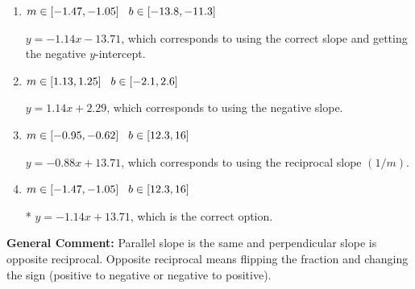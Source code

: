 \documentclass{extbook}[14pt]
\begin{document}
\begin{enumerate}
{\begin{enumerate}[label=\Alph*.]
 $y = -1.14x + 3.00$, which corresponds to correct slope and mis-distributing while simplifying to slope-intercept form.
\item \( m \in [-1.47, -1.05] \hspace*{3mm} b \in [-13.8, -11.3] \)

 $y = -1.14x - 13.71$, which corresponds to using the correct slope and getting the negative $y$-intercept.
\item \( m \in [1.13, 1.25] \hspace*{3mm} b \in [-2.1, 2.6] \)

 $y = 1.14x + 2.29$, which corresponds to using the negative slope.
\item \( m \in [-0.95, -0.62] \hspace*{3mm} b \in [12.3, 16] \)

 $y = -0.88x + 13.71$, which corresponds to using the reciprocal slope $(1/m)$.
\item \( m \in [-1.47, -1.05] \hspace*{3mm} b \in [12.3, 16] \)

* $y = -1.14x + 13.71$, which is the correct option.
\end{enumerate}

\textbf{General Comment:} Parallel slope is the same and perpendicular slope is opposite reciprocal. Opposite reciprocal means flipping the fraction and changing the sign (positive to negative or negative to positive).
}
\end{enumerate}
\end{document}
